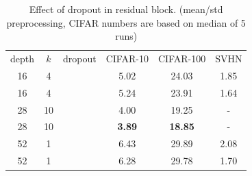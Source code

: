 \documentclass{bmvc2k}
\begin{document}
\newcommand{\chk}{{\centering\checkmark}}
\begin{table}
  \centering
  \begin{tabular}{c|c|c|c|c|c}
    \hline
     depth & $k$ & dropout & CIFAR-10 & CIFAR-100 & SVHN \\
    \Xhline{2\arrayrulewidth}
16 &     4 &      &     5.02 &   24.03 &         1.85\\
16 &     4 &     \chk & 5.24 &   23.91 &         1.64\\
28 &     10 &     &     4.00 &   19.25 & -\\
28 &     10 &    \chk & \textbf{3.89} &   \textbf{18.85} & -\\
52 &     1 &      &     6.43 &   29.89 &         2.08\\
52 &     1 &     \chk & 6.28 &   29.78 &         1.70\\
    \hline
  \end{tabular}
  \vspace{0.1cm}
  \caption{Effect of dropout in residual block. (mean/std preprocessing, CIFAR numbers are based on median of 5 runs)}
  \label{table:dropout}
\end{table}
\end{document}
